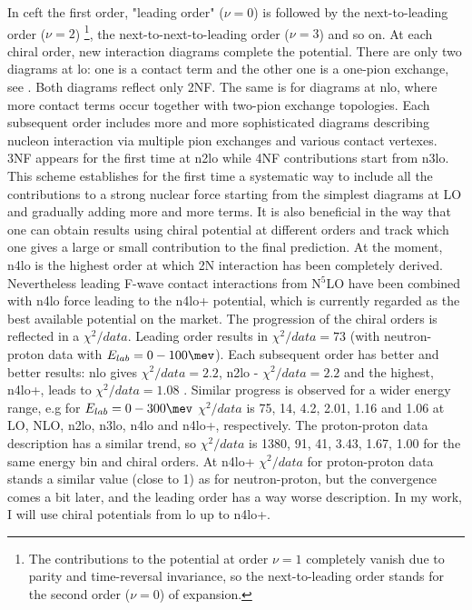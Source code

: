 In \gls{ceft} the first order, "leading order" ($\nu=0$) is followed 
by the next-to-leading order ($\nu=2$)
\footnote{The contributions to the potential at order $\nu=1$ completely vanish due to parity and time-reversal invariance,
so the next-to-leading order stands for the second order ($\nu=0$) of expansion.},
 the next-to-next-to-leading order ($\nu=3$) and so on.
 At each chiral order, new interaction diagrams complete the potential.
 There are only two diagrams at \gls{lo}: one is a contact term
 and the other one
 is a one-pion exchange, see . Both diagrams reflect only 2NF.
 The same is for diagrams at \gls{nlo}, where more contact terms occur together with two-pion 
 exchange topologies. Each subsequent order includes more and more sophisticated diagrams
 describing nucleon interaction
 via multiple pion exchanges and various contact vertexes.
 3NF appears for the first time at \gls{n2lo}
 while 4NF contributions start from \gls{n3lo}.
 This scheme establishes for the first time a systematic
way to include all the contributions to a strong nuclear force
 starting from the simplest diagrams at LO and gradually
adding more and more terms. 
It is also beneficial in the way that 
one can obtain results using chiral potential at different
orders and track which one gives a large or small contribution to the final prediction.
At the moment, \gls{n4lo} is the highest order at which 2N interaction has been completely derived.
Nevertheless leading F-wave contact interactions from N$^5$LO have been combined with \gls{n4lo} force
leading to the \gls{n4lo+} potential,
which is currently regarded as the best available potential on the market.
The progression of the chiral orders is reflected in a $\chi^2/data$.
Leading order results in $\chi^2/data = 73$ (with neutron-proton data with $E_{lab} = 0-100 \unit{\mev}$).
Each subsequent order has better and better results: \gls{nlo} gives $\chi^2/data = 2.2$, \gls{n2lo} - $\chi^2/data = 2.2$
and the highest, \gls{n4lo+}, leads to $\chi^2/data = 1.08$ \cite{reinkrebs2018}.
Similar progress is observed for a wider energy range, e.g for $E_{lab} = 0-300 \unit{\mev}$
$\chi^2/data$ is 75, 14, 4.2, 2.01, 1.16 and 1.06
at LO, NLO, \gls{n2lo}, \gls{n3lo}, \gls{n4lo} and \gls{n4lo+}, respectively.
The proton-proton data description has a similar trend, so $\chi^2/data$ is 1380, 91, 41, 3.43, 1.67, 1.00 
for the same energy bin and chiral orders. At \gls{n4lo+} $\chi^2/data$ for proton-proton data
stands a similar value (close to 1) as for neutron-proton, but the convergence comes a bit later, and 
the leading order has a way worse description.
In my work, I will use chiral potentials from \gls{lo} up to \gls{n4lo+}.

